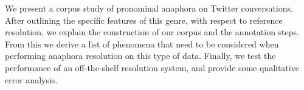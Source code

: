 We present a corpus study of pronominal anaphora on Twitter conversations. After outlining the specific features of this genre, with respect to reference resolution, we explain the construction of our corpus and the annotation steps. From this we derive a list of phenomena that need to be considered when performing anaphora resolution on this type of data. Finally, we test the performance of an off-the-shelf resolution system, and provide some qualitative error analysis.
